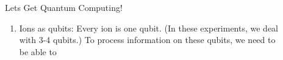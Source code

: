 \documentclass[final,hyperref={pdfpagelabels=false}]{beamer}
\begin{document}
\begin{frame}[t]
\begin{columns}[t]
\begin{column}{.465\textwidth}



\end{column} %

\begin{column}{.03\textwidth}\end{column} %
 
\begin{column}{.465\textwidth} %


\begin{block}{Lets Get Quantum Computing!}

\begin{enumerate}
	\item Ions as qubits: Every ion is one qubit. (In these experiments, we deal
	with 3-4 qubits.) To process information on these qubits, we need to
	be able to 


\end{enumerate}
\end{block}
\end{column}
\end{columns}
\end{frame}
\end{document}
